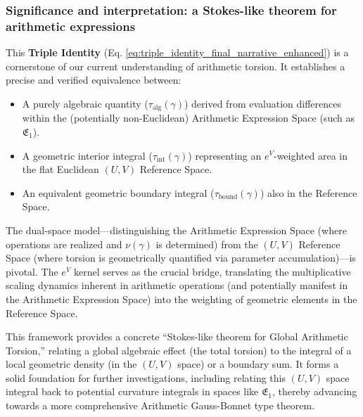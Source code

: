 \subsubsection*{Significance and interpretation: a Stokes-like theorem for arithmetic expressions}

This \textbf{Triple Identity} (Eq. \ref{eq:triple_identity_final_narrative_enhanced}) is a cornerstone of our current understanding of arithmetic torsion. It establishes a precise and verified equivalence between:
\begin{itemize}
    \item A purely algebraic quantity ($\tau_{\text{alg}}(\gamma)$) derived from evaluation differences within the (potentially non-Euclidean) Arithmetic Expression Space (such as $\mathfrak{E}_1$).
    \item A geometric interior integral ($\tau_{\text{int}}(\gamma)$) representing an $e^V$-weighted area in the flat Euclidean $(U,V)$ Reference Space.
    \item An equivalent geometric boundary integral ($\tau_{\text{bound}}(\gamma)$) also in the Reference Space.
\end{itemize}
The dual-space model---distinguishing the Arithmetic Expression Space (where operations are realized and $\nu(\gamma)$ is determined) from the $(U,V)$ Reference Space (where torsion is geometrically quantified via parameter accumulation)---is pivotal. The $e^V$ kernel serves as the crucial bridge, translating the multiplicative scaling dynamics inherent in arithmetic operations (and potentially manifest in the Arithmetic Expression Space) into the weighting of geometric elements in the Reference Space.

This framework provides a concrete ``Stokes-like theorem for Global Arithmetic Torsion,'' relating a global algebraic effect (the total torsion) to the integral of a local geometric density (in the $(U,V)$ space) or a boundary sum. It forms a solid foundation for further investigations, including relating this $(U,V)$ space integral back to potential curvature integrals in spaces like $\mathfrak{E}_1$, thereby advancing towards a more comprehensive Arithmetic Gauss-Bonnet type theorem.
